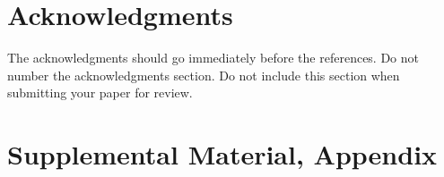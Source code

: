 \documentclass[hidelinks, 11pt]{article}
\begin{document}
\section*{Acknowledgments}
\label{sec:acknowledgments}

The acknowledgments should go immediately before the references.  Do
not number the acknowledgments section. Do not include this section
when submitting your paper for review.

%
%



\appendix

\section{Supplemental Material, Appendix}
\label{sec:supplemental}
\end{document}
